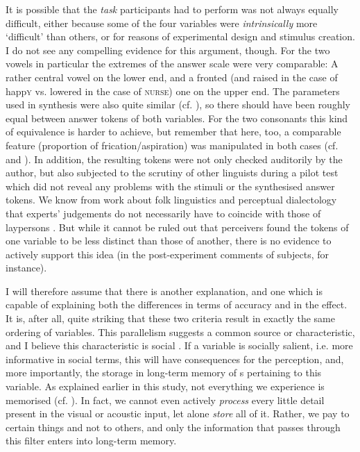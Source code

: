 It is possible that the \emph{task} participants had to perform was not always equally difficult, either because some of the four variables were \emph{intrinsically} more `difficult' than others, or for reasons of experimental design and stimulus creation.
I do not see any compelling evidence for this argument, though.
For the two vowels in particular the extremes of the answer scale were very comparable: A rather central vowel on the lower end, and a fronted (and raised in the case of happ\textsc{y} vs. lowered in the case of \textsc{nurse)} one on the upper end.
The parameters used in synthesis were also quite similar (cf. ), so there should have been roughly equal  between answer tokens of both variables.
For the two consonants this kind of equivalence is harder to achieve, but remember that here, too, a comparable feature (proportion of frication/aspiration) was manipulated in both cases (cf.  and ).
In addition, the resulting tokens were not only checked auditorily by the author, but also subjected to the scrutiny of other linguists during a pilot test which did not reveal any problems with the stimuli or the synthesised answer tokens.
We know from work about folk linguistics and perceptual dialectology that experts' judgements do not necessarily have to coincide with those of laypersons \parencite{preston1999,niedzielskipreston2000}.
But while it cannot be ruled out that perceivers found the tokens of one variable to be less distinct than those of another, there is no evidence to actively support this idea (in the post-experiment comments of subjects, for instance). 

I will therefore assume that there is another explanation, and one which is capable of explaining both the differences in terms of accuracy and in the  effect.
It is, after all, quite striking that these two criteria result in exactly the same ordering of variables.
This parallelism suggests a common source or characteristic, and I believe this characteristic is social .
If a variable is socially salient, i.e. more informative in social terms, this will have consequences for the perception, and, more importantly, the storage in long-term memory of s pertaining to this variable.
As explained earlier in this study, not everything we experience is memorised (cf. ).
In fact, we cannot even actively \emph{process} every little detail present in the visual or acoustic input, let alone \emph{store} all of it.
Rather, we pay  to certain things and not to others, and only the information that passes through this filter enters into long-term memory.

